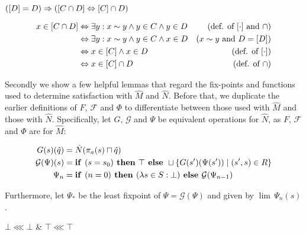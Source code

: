 \begin{lemma}
$([D] = D) \Rightarrow ([C \cap D] \Leftrightarrow [C] \cap D)$
\end{lemma}


\begin{align*}
x \in [C \cap D] & \Leftrightarrow \exists y : x \sim y \wedge y \in C \wedge y \in D & (\textrm{def. of } [\cdot] \textrm{ and } \cap) \\
                     & \Leftrightarrow \exists y : x \sim y \wedge y \in C \wedge x \in D & (x \sim y \textrm{ and } D = [D]) \\
                     & \Leftrightarrow x \in [C] \wedge x \in D                       & (\textrm{def. of } [\cdot]) \\
                     & \Leftrightarrow x \in [C] \cap D                               & (\textrm{def. of } \cap)
\end{align*}

Secondly we show a few helpful lemmas that regard the fix-points and functions used to determine satisfaction with $\hat M$ and $\hat N$. Before that, we duplicate the earlier definitions of $F$, $\mathcal{F}$ and $\Phi$ to differentiate between those used with $\hat M$ and those with $\hat N$. Specifically, let $G$, $\mathcal{G}$ and $\Psi$ be equivalent operations for $\hat N$, as $F$, $\mathcal{F}$ and $\Phi$ are for $\hat M$:

\begin{align*}
G(s)(\hat q) &= \hat N(\pi_{a}(s) \sqcap \hat q) \\
\mathcal{G}(\Psi)(s) &= \textrm{\textbf{if }} (s = s_{0}) \textrm{\textbf{ then }} \top \textrm{\textbf{ else }} \sqcup \{ G(s')(\Psi(s')) \mid (s',s) \in R \} \\
\Psi_{n} &= \textrm{\textbf{if }} (n = 0) \textrm{\textbf{ then }} (\lambda s \in S : \bot) \textrm{\textbf{ else }} \mathcal{G}(\Psi_{n-1}) \\
\end{align*}

\noindent Furthermore, let $\Psi_{*}$ be the least fixpoint of $\Psi = \mathcal{G}(\Psi)$ and given by $\lim \, \Psi_{n}(s)$.

\begin{lemma} \label{lem:bot-refine-bot}
$\bot \lll \bot$ \& $\top \lll \top$
\end{lemma}

